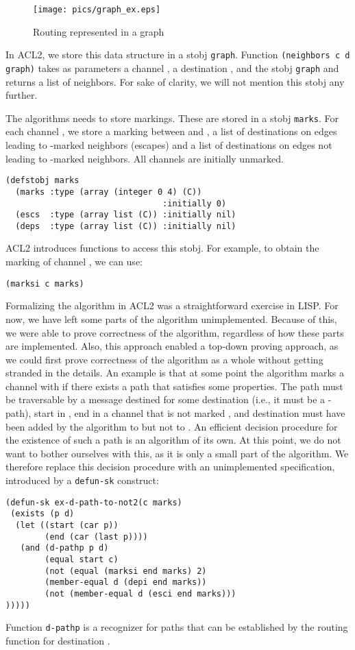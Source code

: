 \documentclass[submission,copyright]{eptcs}
\begin{document}
\begin{figure}[hbpt]
\centering
\texttt{[image: pics/graph\_ex.eps]}
\caption{Routing represented in a graph}
\label{fig:graph}
\end{figure}

In ACL2, we store this data structure in a stobj {\tt graph}. Function {\tt (neighbors c d graph)} takes as parameters a channel , a destination , and the stobj {\tt graph} and returns a list of neighbors. For sake of clarity, we will not mention this stobj any further.

The algorithms needs to store markings. These are stored in a stobj {\tt marks}. For each channel , we store a marking between  and , a list  of destinations on edges leading to -marked neighbors (escapes) and a list  of destinations on edges not leading to -marked neighbors. All channels are initially unmarked.
\begin{verbatim}
(defstobj marks
  (marks :type (array (integer 0 4) (C))
                                :initially 0)
  (escs  :type (array list (C)) :initially nil)
  (deps  :type (array list (C)) :initially nil)
\end{verbatim}
ACL2 introduces functions to access this stobj. For example, to obtain the marking of channel , we can use:
\begin{center}
{\tt (marksi c marks)}
\end{center}

Formalizing the algorithm in ACL2 was a straightforward exercise in LISP. For now, we have left some parts of the algorithm unimplemented. Because of this, we were able to prove correctness of the algorithm, regardless of how these parts are implemented. Also, this approach enabled a top-down proving approach, as we could first prove correctness of the algorithm as a whole without getting stranded in the details. An example is that at some point the algorithm marks a channel  with  if there exists a path that satisfies some properties. The path must be traversable by a message destined for some destination  (i.e., it must be a -path), start in , end in a channel  that is not marked , and destination  must have been added by the algorithm to  but not to . An efficient decision procedure for the existence of such a path is an algorithm of its own. At this point, we do not want to bother ourselves with this, as it is only a small part of the algorithm. We therefore replace this decision procedure with an unimplemented specification, introduced by a {\tt defun-sk} construct:
\begin{verbatim}
(defun-sk ex-d-path-to-not2(c marks)
 (exists (p d)
  (let ((start (car p))
        (end (car (last p))))
   (and (d-pathp p d)
        (equal start c)
        (not (equal (marksi end marks) 2)
        (member-equal d (depi end marks))
        (not (member-equal d (esci end marks)))
)))))
\end{verbatim}
Function {\tt d-pathp} is a recognizer for paths that can be established by the routing function for destination .
\end{document}
